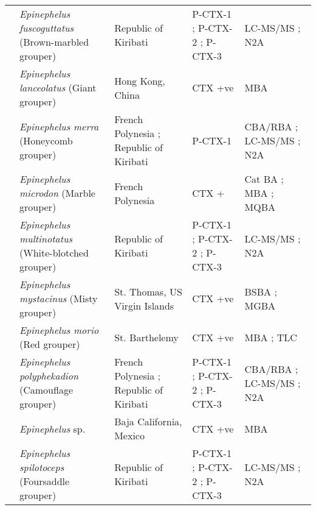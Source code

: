 \documentclass[12pt]{article}
\begin{document}
\begin{longtable}{ | p{2cm} | p{3cm} | p{4.5cm} | p{2cm} | p{3cm} | }
	& \emph{Epinephelus fuscoguttatus} (Brown-marbled grouper) &  Republic of Kiribati \cite{mak2013pacific} & P-CTX-1 \cite{mak2013pacific}; P-CTX-2 \cite{mak2013pacific}; P-CTX-3 \cite{mak2013pacific} & LC-MS/MS \cite{mak2013pacific}; N2A \cite{mak2013pacific} \\
	& \emph{Epinephelus lanceolatus} (Giant grouper) & Hong Kong, China \cite{wong2009solid} & CTX +ve \cite{wong2009solid} & MBA \cite{wong2009solid} \\
	& \emph{Epinephelus merra} (Honeycomb grouper) & French Polynesia \cite{chinain2014mail}; Republic of Kiribati \cite{mak2013pacific} & P-CTX-1 \cite{mak2013pacific} & CBA/RBA \cite{chinain2014mail}; LC-MS/MS \cite{mak2013pacific}; N2A \cite{mak2013pacific} \\
	& \emph{Epinephelus microdon} (Marble grouper) & French Polynesia \cite{bagnis1987use} & CTX +\cite{bagnis1987use} & Cat BA \cite{bagnis1987use}; MBA \cite{bagnis1987use}; MQBA \cite{bagnis1987use} \\
	& \emph{Epinephelus multinotatus} (White-blotched grouper) & Republic of Kiribati \cite{mak2013pacific} & P-CTX-1 \cite{mak2013pacific}; P-CTX-2 \cite{mak2013pacific}; P-CTX-3 \cite{mak2013pacific} & LC-MS/MS \cite{mak2013pacific}; N2A \cite{mak2013pacific} \\
	& \emph{Epinephelus mystacinus} (Misty grouper) & St. Thomas, US Virgin Islands \cite{granade1976ciguatera} & CTX +ve \cite{granade1976ciguatera} & BSBA \cite{granade1976ciguatera}; MGBA \cite{granade1976ciguatera} \\
	& \emph{Epinephelus morio} (Red grouper) & St. Barthelemy \cite{vernoux1986heterogeneity} & CTX +ve\cite{vernoux1986heterogeneity} & MBA \cite{vernoux1986heterogeneity}; TLC \cite{vernoux1986heterogeneity} \\
	& \emph{Epinephelus polyphekadion} (Camouflage grouper) & French Polynesia \cite{chinain2014mail}; Republic of Kiribati \cite{mak2013pacific} & P-CTX-1 \cite{mak2013pacific}; P-CTX-2 \cite{mak2013pacific}; P-CTX-3 \cite{mak2013pacific} &  CBA/RBA \cite{chinain2014mail}; LC-MS/MS \cite{mak2013pacific}; N2A \cite{mak2013pacific}  \\
	& \emph{Epinephelus} sp. & Baja California, Mexico \cite{lechuga1995documented} & CTX +ve \cite{lechuga1995documented} & MBA \cite{lechuga1995documented} \\
	& \emph{Epinephelus spilotoceps} (Foursaddle grouper) & Republic of Kiribati \cite{mak2013pacific} & P-CTX-1 \cite{mak2013pacific}; P-CTX-2 \cite{mak2013pacific}; P-CTX-3 \cite{mak2013pacific} & LC-MS/MS \cite{mak2013pacific}; N2A \cite{mak2013pacific} \\

\end{longtable}
\end{document}
